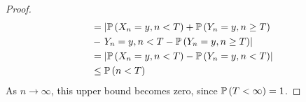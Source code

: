 \begin{proof}
\begin{align*}
		                              & = \left| \mathbb{P}\left({X_n = y, n < T}\right) + \mathbb{P}\left({Y_n = y, n \geq T}\right) \right.
		\\
		                              & - \left.
		{Y_n = y, n < T} - \mathbb{P}\left({Y_n = y, n \geq T}\right) \right|                                               \\
		                              & = \abs{\mathbb{P}\left({X_n = y, n < T}\right) - \mathbb{P}\left({Y_n = y, n < T}\right)}             \\
		                              & \leq \mathbb{P}\left({n < T}\right)
	\end{align*}
	As \( n \to \infty \), this upper bound becomes zero, since \( \mathbb{P}\left({T < \infty}\right) = 1 \).
\end{proof}
